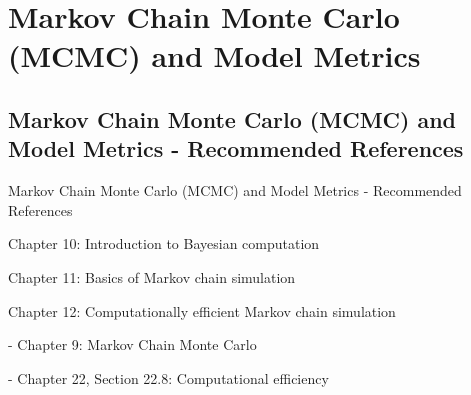 
\section{Markov Chain Monte Carlo (MCMC) and Model Metrics}

\subsection{Markov Chain Monte Carlo (MCMC) and Model Metrics - Recommended References}
\begin{frame}{Markov Chain Monte Carlo (MCMC) and Model Metrics - Recommended References}
	\begin{vfilleditems}
		\item \textcite{gelman2013bayesian}
		\begin{vfilleditems}
			\item Chapter 10: Introduction to Bayesian computation
			\item Chapter 11: Basics of Markov chain simulation
			\item Chapter 12: Computationally efficient Markov chain simulation
		\end{vfilleditems}
		\item \textcite{mcelreath2020statistical} - Chapter 9: Markov Chain Monte Carlo
		\item \textcite{neal2011mcmc}
		\item \textcite{betancourtConceptualIntroductionHamiltonian2017}
		\item \textcite{gelman2020regression} - Chapter 22, Section 22.8: Computational efficiency
		\item \textcite{chibUnderstandingMetropolisHastingsAlgorithm1995}
		\item \textcite{casellaExplainingGibbsSampler1992}
	\end{vfilleditems}
\end{frame}

